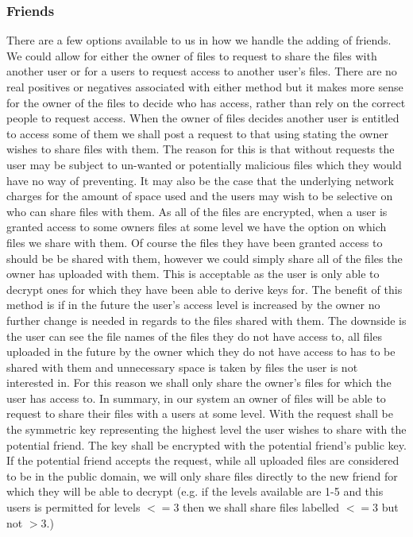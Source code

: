 \documentclass[12pt, titlepage]{article}
\begin{document}
\subsubsection{Friends}
There are a few options available to us in how we handle the adding of friends. We could allow for either the owner of files to request to share the files with another user or for a users to request access to another user's files. There are no real positives or negatives associated with either method but it makes more sense for the owner of the files to decide who has access, rather than rely on the correct people to request access.
\newline \indent When the owner of files decides another user is entitled to access some of them we shall post a request to that using stating the owner wishes to share files with them. The reason for this is that without requests the user may be subject to un-wanted or potentially malicious files which they would have no way of preventing. It may also be the case that the underlying network charges for the amount of space used and the users may wish to be selective on who can share files with them.
\newline \indent As all of the files are encrypted, when a user is granted access to some owners files at some level we have the option on which files we share with them. Of course the files they have been granted access to should be be shared with them, however we could simply share all of the files the owner has uploaded with them. This is acceptable as the user is only able to decrypt ones for which they have been able to derive keys for. The benefit of this method is if in the future the user's access level is increased by the owner no further change is needed in regards to the files shared with them. The downside is the user can see the file names of the files they do not have access to, all files uploaded in the future by the owner which they do not have access to has to be shared with them and unnecessary space is taken by files the user is not interested in. For this reason we shall only share the owner's files for which the user has access to.
In summary, in our system an owner of files will be able to request to share their files with a users at some level. With the request shall be the symmetric key representing the highest level the user wishes to share with the potential friend. The key shall be encrypted with the potential friend's public key. If the potential friend accepts the request, while all uploaded files are considered to be in the public domain, we will only share files directly to the new friend for which they will be able to decrypt (e.g. if the levels available are 1-5 and this users is permitted for levels $<= 3$ then we shall share files labelled $<= 3$ but not $> 3$.)
\end{document}
